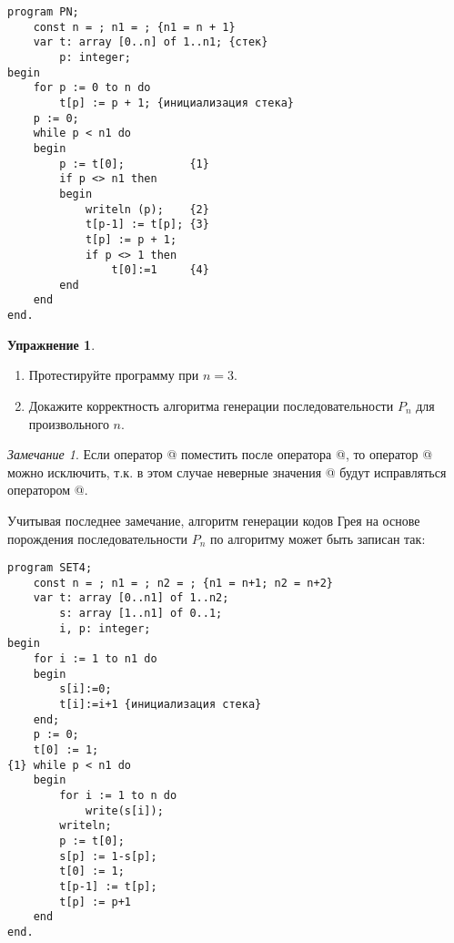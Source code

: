 \documentclass[12pt,a4paper]{article}
\theoremstyle{plain}
\theoremstyle{definition}
\newtheorem*{task}{Упражнение}
\theoremstyle{remark}
\newtheorem*{remark}{Замечание}
\newtheorem*{comment}{Комментарий}
\begin{document}
\begin{verbatim}
program PN;
    const n = ; n1 = ; {n1 = n + 1}
    var t: array [0..n] of 1..n1; {стек}
        p: integer;
begin
    for p := 0 to n do
        t[p] := p + 1; {инициализация стека}
    p := 0;
    while p < n1 do
    begin
        p := t[0];          {1}
        if p <> n1 then
        begin
            writeln (p);    {2}
            t[p-1] := t[p]; {3}
            t[p] := p + 1;
            if p <> 1 then
                t[0]:=1     {4}
        end
    end
end.
\end{verbatim}

\begin{task}
~\\
\begin{enumerate}
\item Протестируйте программу \verb@PN@ при $n=3$.
\item Докажите корректность алгоритма генерации последовательности $P_n$ для произвольного $n$.
\end{enumerate}
\end{task}

\begin{remark}
Если оператор @ поместить после оператора @, то оператор @ можно исключить, т.к. в этом случае неверные значения \verb@t[0]@ будут исправляться оператором @.
\end{remark}

Учитывая последнее замечание, алгоритм генерации кодов Грея на основе порождения последовательности $P_n$ по алгоритму \verb@PN@ может быть записан так:

\begin{verbatim}
program SET4;
    const n = ; n1 = ; n2 = ; {n1 = n+1; n2 = n+2}
    var t: array [0..n1] of 1..n2;
        s: array [1..n1] of 0..1;
        i, p: integer;
begin
    for i := 1 to n1 do
    begin
        s[i]:=0;
        t[i]:=i+1 {инициализация стека}
    end;
    p := 0;
    t[0] := 1;
{1} while p < n1 do
    begin
        for i := 1 to n do
            write(s[i]);
        writeln;
        p := t[0];
        s[p] := 1-s[p];
        t[0] := 1;
        t[p-1] := t[p];
        t[p] := p+1
    end
end.
\end{verbatim}

\begin{comment}
Добавление в массивы $t$ и $s$ $n+1$-х элементов сделано для того, чтобы сократить число проверок внутри цикла \verb@{1}@.
\end{comment}
\end{document}
